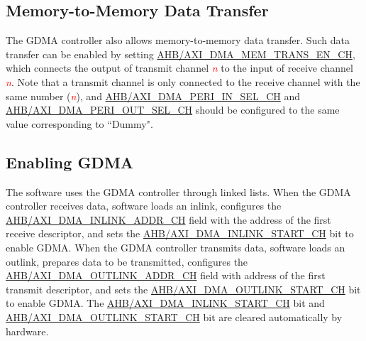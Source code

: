 \documentclass[main\_\_EN.tex]{subfiles}
\begin{document}
\subsection{Memory-to-Memory Data Transfer}

The GDMA controller also allows memory-to-memory data transfer. Such data transfer can be enabled by setting \hyperref[fielddesc:AHBDMAMEMTRANSENCHN]{AHB/AXI\_DMA\_MEM\_TRANS\_EN\_CH}, which connects the output of transmit channel \textcolor{red}{\it{n}} to the input of receive channel \textcolor{red}{\it{n}}. Note that a transmit channel is only connected to the receive channel with the same number (\textcolor{red}{\it{n}}), and \hyperref[fielddesc:AHBDMAPERIINSELCHN]{AHB/AXI\_DMA\_PERI\_IN\_SEL\_CH} and \hyperref[fielddesc:AHBDMAPERIOUTSELCHN]{AHB/AXI\_DMA\_PERI\_OUT\_SEL\_CH} should be configured to the same value corresponding to ``Dummy".



\subsection{Enabling GDMA}

The software uses the GDMA controller through linked lists. When the GDMA controller receives data, software loads an inlink, configures the \hyperref[fielddesc:AHBDMAINLINKADDRCHN]{AHB/AXI\_DMA\_INLINK\_ADDR\_CH} field with the address of the first receive descriptor, and sets the \hyperref[fielddesc:AHBDMAINLINKSTARTCHN]{AHB/AXI\_DMA\_INLINK\_START\_CH} bit to enable GDMA. When the GDMA controller transmits data, software loads an outlink, prepares data to be transmitted, configures the \hyperref[fielddesc:AHBDMAOUTLINKADDRCHN]{AHB/AXI\_DMA\_OUTLINK\_ADDR\_CH} field with address of the first transmit descriptor, and sets the \hyperref[fielddesc:AHBDMAOUTLINKSTARTCHN]{AHB/AXI\_DMA\_OUTLINK\_START\_CH} bit to enable GDMA. The \hyperref[fielddesc:AHBDMAINLINKSTARTCHN]{AHB/AXI\_DMA\_INLINK\_START\_CH} bit and \hyperref[fielddesc:AHBDMAOUTLINKSTARTCHN]{AHB/AXI\_DMA\_OUTLINK\_START\_CH} bit are cleared automatically by hardware.
\end{document}
